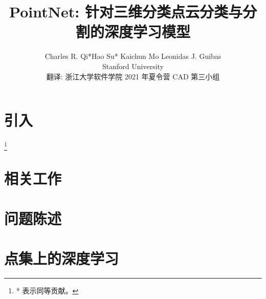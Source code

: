 \documentclass[10pt,twocolumn,letterpaper,UTF8]{article}
\newcommand\blfootnote[1]{%
  \begingroup
  \renewcommand\thefootnote{}\footnote{#1}%
  \addtocounter{footnote}{-1}%
  \endgroup
}
\begin{document}
\title{PointNet: 针对三维分类点云分类与分割的深度学习模型
}


\author{Charles R. Qi*\qquad Hao Su* \qquad Kaichun Mo \qquad Leonidas J. Guibas\\Stanford University\\翻译: 浙江大学软件学院 2021 年夏令营 CAD 第三小组}

\maketitle

\begin{abstract}
{\normalfont
  
}
\end{abstract}

\section{引入}
\blfootnote{* 表示同等贡献。}


\section{相关工作}


\section{问题陈述}


\section{点集上的深度学习}

\end{document}
